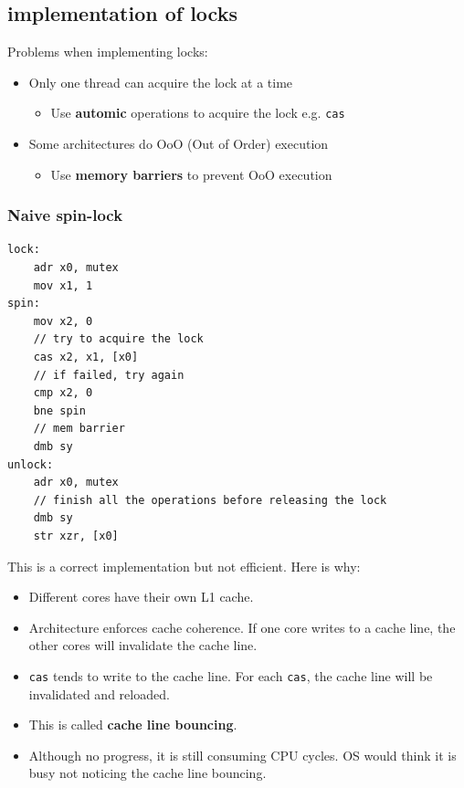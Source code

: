 \documentclass[letterpaper,12pt]{article}
\begin{document}
\subsection{implementation of locks}
Problems when implementing locks: \begin{itemize}
    \item Only one thread can acquire the lock at a time \begin{itemize}
        \item Use \textbf{automic} operations to acquire the lock e.g. \texttt{cas}
    \end{itemize}
    \item Some architectures do OoO (Out of Order) execution \begin{itemize}
        \item Use \textbf{memory barriers} to prevent OoO execution
    \end{itemize}
\end{itemize}
\subsubsection{Naive spin-lock}
\begin{lstlisting}
lock:
    adr x0, mutex
    mov x1, 1
spin:
    mov x2, 0
    // try to acquire the lock
    cas x2, x1, [x0]
    // if failed, try again
    cmp x2, 0
    bne spin
    // mem barrier
    dmb sy 
unlock:
    adr x0, mutex
    // finish all the operations before releasing the lock
    dmb sy
    str xzr, [x0]
\end{lstlisting}
This is a correct implementation but not efficient. Here is why:\begin{itemize}
    \item Different cores have their own L1 cache.
    \item Architecture enforces cache coherence. If one core writes to a cache line, the other cores will invalidate the cache line.
    \item \texttt{cas} tends to write to the cache line. For each \texttt{cas}, the cache line will be invalidated and reloaded.
    \item This is called \textbf{cache line bouncing}.
    \item Although no progress, it is still consuming CPU cycles. OS would think it is busy not noticing the cache line bouncing.
\end{itemize}
\end{document}
